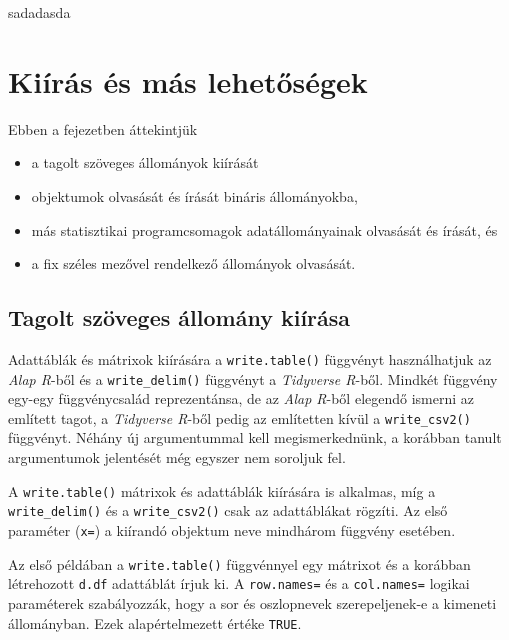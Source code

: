 \documentclass[
]{book}
\makeatletter
\providecommand{\tightlist}{%
  \setlength{\itemsep}{0pt}\setlength{\parskip}{0pt}}
\newenvironment{kframe}{%
\medskip{}
\setlength{\fboxsep}{.8em}
 \def\at@end@of@kframe{}%
 \ifinner\ifhmode%
  \def\at@end@of@kframe{\end{minipage}}%
  \begin{minipage}{\columnwidth}%
 \fi\fi%
 \def\FrameCommand##1{\hskip\@totalleftmargin \hskip-\fboxsep
 \colorbox{shadecolor}{##1}\hskip-\fboxsep
     \hskip-\linewidth \hskip-\@totalleftmargin \hskip\columnwidth}%
 \MakeFramed {\advance\hsize-\width
   \@totalleftmargin\z@ \linewidth\hsize
   \@setminipage}}%
 {\par\unskip\endMakeFramed%
 \at@end@of@kframe}
\newenvironment{rmdblock}[1]
  {
  \begin{itemize}
  \renewcommand{\labelitemi}{
    \raisebox{-.7\height}[0pt][0pt]{
      {\setkeys{Gin}{width=3em,keepaspectratio}\texttt{[image: images/\#1]}}
    }
  }
  \setlength{\fboxsep}{1em}
  \begin{kframe}
  \item
  }
  {
  \end{kframe}
  \end{itemize}
  }
\newenvironment{rmdlevel3}
  {\begin{rmdblock}{level3}}
  {\end{rmdblock}}
\newenvironment{rmdexercise}
  {\begin{rmdblock}{exercise}}
  {\end{rmdblock}}
\makeatother
\begin{document}
\begin{rmdexercise}
sadadasda
\end{rmdexercise}

\hypertarget{kiuxedruxe1s-uxe9s-muxe1s-lehetux151suxe9gek}{%
\section{Kiírás és más lehetőségek}\label{kiuxedruxe1s-uxe9s-muxe1s-lehetux151suxe9gek}}

\begin{rmdlevel3}
Ebben a fejezetben áttekintjük

\begin{itemize}
\tightlist
\item
  a tagolt szöveges állományok kiírását
\item
  objektumok olvasását és írását bináris állományokba,
\item
  más statisztikai programcsomagok adatállományainak olvasását és írását, és
\item
  a fix széles mezővel rendelkező állományok olvasását.
\end{itemize}
\end{rmdlevel3}

\hypertarget{tagolt-szuxf6veges-uxe1llomuxe1ny-kiuxedruxe1sa}{%
\subsection{Tagolt szöveges állomány kiírása}\label{tagolt-szuxf6veges-uxe1llomuxe1ny-kiuxedruxe1sa}}

Adattáblák és mátrixok kiírására a \texttt{write.table()} függvényt használhatjuk az \emph{Alap R}-ből és a \texttt{write\_delim()} függvényt a \emph{Tidyverse R}-ből. Mindkét függvény egy-egy függvénycsalád reprezentánsa, de az \emph{Alap R}-ből elegendő ismerni az említett tagot, a \emph{Tidyverse R}-ből pedig az említetten kívül a \texttt{write\_csv2()} függvényt. Néhány új argumentummal kell megismerkednünk, a korábban tanult argumentumok jelentését még egyszer nem soroljuk fel.

A \texttt{write.table()} mátrixok és adattáblák kiírására is alkalmas, míg a \texttt{write\_delim()} és a \texttt{write\_csv2()} csak az adattáblákat rögzíti. Az első paraméter (\texttt{x=}) a kiírandó objektum neve mindhárom függvény esetében.

Az első példában a \texttt{write.table()} függvénnyel egy mátrixot és a korábban létrehozott \texttt{d.df} adattáblát írjuk ki. A \texttt{row.names=} és a \texttt{col.names=} logikai paraméterek szabályozzák, hogy a sor és oszlopnevek szerepeljenek-e a kimeneti állományban. Ezek alapértelmezett értéke \texttt{TRUE}.
\end{document}
